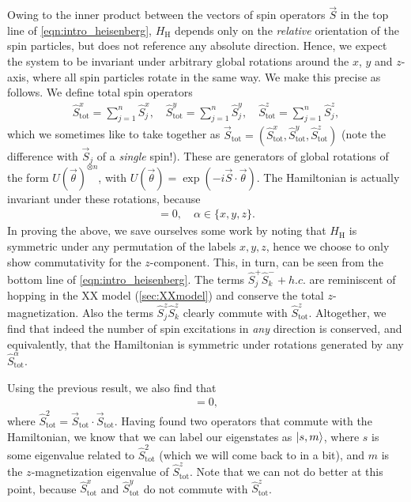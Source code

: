 Owing to the inner product between the vectors of spin operators $\vec{S}$ in the top line of \cref{eqn:intro_heisenberg}, $H_\text{H}$ depends only on the \emph{relative} orientation of the spin particles, but does not reference any absolute direction. Hence, we expect the system to be invariant under arbitrary global rotations around the $x$, $y$ and $z$-axis, where all spin particles rotate in the same way. We make this precise as follows. We define total spin operators
\begin{align}
\hat{S}_\text{tot}^x = \sum_{j=1}^n \hat{S}^x_j, \quad \hat{S}_\text{tot}^y = \sum_{j=1}^n \hat{S}^y_j, \quad \hat{S}_\text{tot}^z =  \sum_{j=1}^n \hat{S}^z_j,
\end{align}
which we sometimes like to take together as $\vec{S}_\text{tot} = ( \hat{S}_\text{tot}^x, \hat{S}_\text{tot}^y, \hat{S}_\text{tot}^z )$ (note the difference with $\vec{S}_j$ of a \emph{single} spin!). These are generators of global rotations of the form $U(\vec{\theta})^{\otimes n}$, with $U(\vec{\theta}) = \exp(-i \vec{S} \cdot \vec{\theta} )$.  %
The Hamiltonian is actually invariant under these rotations, because 
\begin{align}
[H_\text{H} , \hat{S}_\text{tot}^\alpha ] = 0, \quad \alpha \in \{ x, y, z\}.
\end{align}
In proving the above, we save ourselves some work by noting that  $H_\text{H}$ is symmetric under any permutation of the labels $x, y, z$, hence we choose to only show commutativity for the $z$-component. This, in turn, can be seen from the bottom line of \cref{eqn:intro_heisenberg}. The terms $\hat{S}^+_j \hat{S}^-_k + h.c.$ are reminiscent of hopping in the XX model (\cref{sec:XXmodel}) and conserve the total $z$-magnetization. Also the terms $\hat{S}^z_j \hat{S}^z_k$ clearly commute with $\hat{S}_\text{tot}^z$. Altogether, we find that indeed the number of spin excitations in \emph{any} direction is conserved, and equivalently, that the Hamiltonian is symmetric under rotations generated by any $\hat{S}^\alpha_{\text{tot}}$. 

Using the previous result, we also find that 
\begin{align}
[H_\text{H} ,  ( \hat{S}_\text{tot} )^2  ] = 0,
\end{align}
where $\hat{S}_\text{tot}^2 = \vec{S}_\text{tot} \cdot \vec{S}_\text{tot}$. Having found two operators that commute with the Hamiltonian, we know that we can label our eigenstates as $\lvert s, m\rangle$, where $s$ is some eigenvalue related to $\hat{S}_\text{tot}^2$ (which we will come back to in a bit), and $m$ is the $z$-magnetization eigenvalue of $\hat{S}_\text{tot}^z$. Note that we can not do better at this point, because $\hat{S}_\text{tot}^x$ and $\hat{S}_\text{tot}^y$ do not commute with $\hat{S}_\text{tot}^z$.

